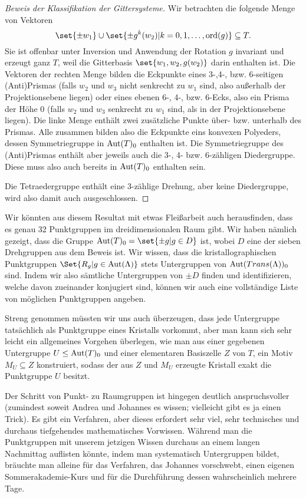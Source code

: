 \begin{proof}[Beweis der Klassifikation der Gittersysteme]
Wir betrachten die folgende Menge von Vektoren
\[\set{\pm w_1}\cup\set{\pm g^k(w_2) | k=0,1,\ldots,\ord(g)} \subseteq T.\]
Sie ist offenbar unter Inversion und Anwendung der Rotation $g$ invariant und erzeugt ganz $T$, weil die Gitterbasis $\set{w_1,w_2,g(w_2)}$ darin enthalten ist. Die Vektoren der rechten Menge bilden die Eckpunkte eines 3-,4-, bzw. 6-seitigen (Anti)Prismas (falls $w_2$ und $w_3$ nicht senkrecht zu $w_1$ sind, also außerhalb der Projektionsebene liegen) oder eines ebenen 6-, 4-, bzw. 6-Ecks, also ein Prisma der Höhe 0 (falls $w_2$ und $w_3$ senkrecht zu $w_1$ sind, als in der Projektionsebene liegen). Die linke Menge enthält zwei zusätzliche Punkte über- bzw. unterhalb des Prismas. Alle zusammen bilden also die Eckpunkte eins konvexen Polyeders, dessen Symmetriegruppe in $\operatorname{Aut}(T)_0$ enthalten ist. Die Symmetriegruppe des (Anti)Prismas enthält aber jeweils auch die 3-, 4- bzw. 6-zähligen Diedergruppe. Diese muss also auch bereits in $\operatorname{Aut}(T)_0$ enthalten sein.

Die Tetraedergruppe enthält eine 3-zählige Drehung, aber keine Diedergruppe, wird also damit auch ausgeschlossen.
\end{proof}

\begin{remark}
Wir könnten aus diesem Resultat mit etwas Fleißarbeit auch herausfinden, dass es genau 32 Punktgruppen im dreidimensionalen Raum gibt. Wir haben nämlich gezeigt, dass die Gruppe $\Aut(T)_0 = \set{\pm g | g\in D}$ ist, wobei $D$ eine der sieben Drehgruppen aus dem Beweis ist. Wir wissen, dass die kristallographischen Punktgruppen $\Set{R_g | g\in\Aut(\Lambda)}$ stets Untergruppen von $\operatorname{Aut}(Trans(\Lambda))_0$ sind. Indem wir also sämtliche Untergruppen von $\pm D$ finden und identifizieren, welche davon zueinander konjugiert sind, können wir auch eine vollständige Liste von möglichen Punktgruppen angeben.

Streng genommen müssten wir uns auch überzeugen, dass jede Untergruppe tatsächlich als Punktgruppe eines Kristalls vorkommt, aber man kann sich sehr leicht ein allgemeines Vorgehen überlegen, wie man aus einer gegebenen Untergruppe $U\leq\operatorname{Aut}(T)_0$ und einer elementaren Basiszelle $Z$ von $T$, ein Motiv $M_U\subseteq Z$ konstruiert, sodass der aus $Z$ und $M_U$ erzeugte Kristall exakt die Punktgruppe $U$ besitzt.
\end{remark}

\begin{remark}
Der Schritt von Punkt- zu Raumgruppen ist hingegen deutlich anspruchsvoller (zumindest soweit Andrea und Johannes es wissen; vielleicht gibt es ja einen Trick). Es gibt ein Verfahren, aber dieses erfordert sehr viel, sehr technisches und durchaus tiefgehendes mathematisches Vorwissen. Während man die Punktgruppen mit unserem jetzigen Wissen durchaus an einem langen Nachmittag auflisten könnte, indem man systematisch Untergruppen bildet, bräuchte man alleine für das Verfahren, das Johannes vorschwebt, einen eigenen Sommerakademie-Kurs und für die Durchführung dessen wahrscheinlich mehrere Tage.
\end{remark}